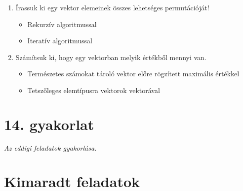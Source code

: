 \documentclass[a4paper]{article}
\begin{document}
\begin{enumerate}
\item

Írassuk ki egy vektor elemeinek összes lehetséges permutációját!
\begin{itemize}
    \item[a.] Rekurzív algoritmussal
    \item[b.] Iteratív algoritmussal
\end{itemize}

\item

Számítsuk ki, hogy egy vektorban melyik értékből mennyi van.
\begin{itemize}
    \item[a.] Természetes számokat tároló vektor előre rögzített maximális értékkel
    \item[b.] Tetszőleges elemtípusra vektorok vektorával
\end{itemize}

\end{enumerate}

\section*{14. gyakorlat}

\textit{Az eddigi feladatok gyakorlása.}


\section*{Kimaradt feladatok}
\end{document}

